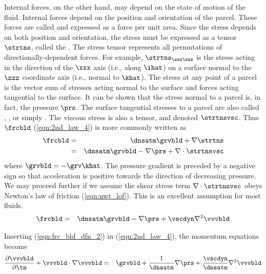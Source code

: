 \documentclass[12pt,twoside]{book}
\begin{document}
Internal forces, on the other hand, may depend on the state of motion
of the fluid.
Internal forces depend on the position and orientation of the parcel.
These forces are called  and expressed as a force per
unit area.
Since the stress depends on both position and orientation, the stress
must be expressed as a tensor $\strtns$, called the .  
The stress tensor represents all permutations of
directionally-dependent forces. 
For example, $\strtns_{\xxx\zzz}$ is the stress acting in the direction
of the $\xxx$ axis (i.e., along $\ihat$) on a surface normal to the
$\zzz$ coordinate axis (i.e., normal to $\khat$).
The stress at any point of a parcel is the vector sum of stresses
acting normal to the surface and forces acting tangential to the
surface. 
It can be shown that the stress normal to a parcel is, in fact, the 
pressure $\prs$.
The surface tangential stresses to a parcel are also called
, ,  or simply . 
The viscous stress is also a tensor, and denoted $\strtnsvsc$.
Thus $\frcbld$ (\ref{eqn:2nd_law_4}) is more commonly written as 
\begin{eqnarray}
\frcbld & = & \dnsatm \grvbld + \nabla \strtns \nonumber \\
& = & \dnsatm \grvbld - \nabla \prs + \nabla \cdot \strtnsvsc
\label{eqn:frc_bld_dfn}
\end{eqnarray}
where $\grvbld = - \grv \khat$.
The pressure gradient is preceded by a negative sign so that
acceleration is positive towards the direction of decreasing
pressure. 
We may proceed further if we assume the shear stress term $\nabla
\cdot \strtnsvsc$ obeys Newton's law of friction (\ref{eqn:nwt_lof}).  
This is an excellent assumption for most fluids.
\begin{eqnarray}
\frcbld & = & \dnsatm \grvbld - \nabla \prs + \vscdyn \nabla^{2} \vvvbld
\label{eqn:frc_bld_dfn_2}
\end{eqnarray}

Inserting (\ref{eqn:frc_bld_dfn_2}) in (\ref{eqn:2nd_law_4}), the
momentum equations become 
\begin{eqnarray}
\frac{\partial \vvvbld}{\partial \tm} + \vvvbld \cdot \nabla \vvvbld 
& = & \grvbld + 
\frac{1}{\dnsatm } \nabla \prs + 
\frac{\vscdyn}{\dnsatm } \nabla^{2} \vvvbld
\label{eqn:2nd_law_5}
\end{eqnarray}
\end{document}
